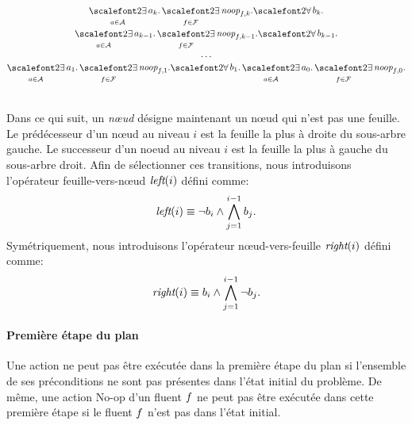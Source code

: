 \begin{small}
\[
\begin{matrix}
\displaystyle \bigexists_{\a \in \A} \a_{\depth}. \bigexists_{\f\in \F} \noop{\f}{\depth}.%
\displaystyle {\bigforall b_{\depth}.}\\
\displaystyle \bigexists_{\a \in \A} \a_{\depth-1}. \bigexists_{\f\in \F} \noop{\f}{\depth-1}.%
\displaystyle {\bigforall b_{\depth-1}.}\\
\displaystyle \dots\\ 
\displaystyle \bigexists_{\a \in \A} \a_{1}. \bigexists_{\f\in \F} \noop{\f}{1}.%
\displaystyle {\bigforall b_{1}.}%
\displaystyle \bigexists_{\a \in \A} \a_{0}. \bigexists_{\f\in \F} \noop{\f}{0}.
\end{matrix}
\]
\end{small}\\

Dans ce qui suit, un \textit{n\oe ud} désigne maintenant un n\oe ud qui n'est pas une feuille. %
Le prédécesseur d'un n\oe ud au niveau $i$ est la feuille la plus à droite du sous-arbre gauche. Le successeur d'un noeud au niveau $i$ est la feuille la plus à gauche du sous-arbre droit.
Afin de sélectionner ces transitions, nous introduisons l'opérateur feuille-vers-n\oe ud $\textit{left}(i)$ défini comme:
\[\textit{left}(i) \equiv \neg b_{i} \wedge \bigwedge\limits_{\substack{j=1}}^{i-1} b_{j}.\]
Symétriquement, nous introduisons l'opérateur n\oe ud-vers-feuille $\textit{right}(i)$ défini comme:
\[\textit{right}(i) \equiv b_{i} \wedge \bigwedge\limits_{\substack{j=1}}^{i-1} \neg b_{j}.\]


\paragraph*{Première étape du plan}

Une action ne peut pas être exécutée dans la première étape du plan si l'ensemble de ses préconditions ne sont pas présentes dans l'état initial du problème. De même, une action No-op d'un fluent $f$ ne peut pas être exécutée dans cette première étape si le fluent $f$ n'est pas dans l'état initial.

